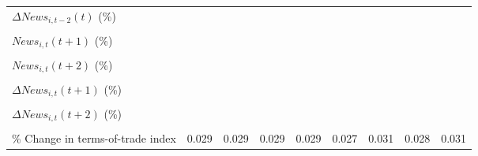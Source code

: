 {\begin{tabular}{l*{8}{c}}
\addlinespace
$ \Delta News_{i,t-2}(t)$ (\%)&                     &                     &                     &                     &                     &                     &                     &                     \\
                    &                     &                     &                     &                     &                     &                     &                     &                     \\
\addlinespace
$ News_{i,t}(t+1)$ (\%)&                     &                     &                     &                     &                     &                     &                     &                     \\
                    &                     &                     &                     &                     &                     &                     &                     &                     \\
\addlinespace
$ News_{i,t}(t+2)$ (\%)&                     &                     &                     &                     &                     &                     &                     &                     \\
                    &                     &                     &                     &                     &                     &                     &                     &                     \\
\addlinespace
$ \Delta News_{i,t}(t+1)$ (\%)&                     &                     &                     &                     &                     &                     &                     &                     \\
                    &                     &                     &                     &                     &                     &                     &                     &                     \\
\addlinespace
$ \Delta News_{i,t}(t+2)$ (\%)&                     &                     &                     &                     &                     &                     &                     &                     \\
                    &                     &                     &                     &                     &                     &                     &                     &                     \\
\addlinespace
\% Change in terms-of-trade index&       0.029\sym{*}  &       0.029\sym{*}  &       0.029\sym{*}  &       0.029\sym{*}  &       0.027\sym{*}  &       0.031\sym{**} &       0.028\sym{**} &       0.031\sym{**} \\

\end{tabular}}
